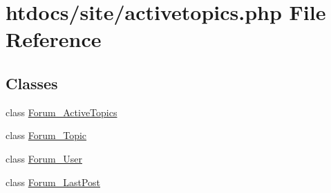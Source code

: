 \hypertarget{activetopics_8php}{\section{htdocs/site/activetopics.php File Reference}
\label{activetopics_8php}
}
\subsection*{Classes}
\begin{DoxyCompactItemize}
\item 
class \hyperlink{class_forum___active_topics}{Forum\-\_\-\-Active\-Topics}
\item 
class \hyperlink{class_forum___topic}{Forum\-\_\-\-Topic}
\item 
class \hyperlink{class_forum___user}{Forum\-\_\-\-User}
\item 
class \hyperlink{class_forum___last_post}{Forum\-\_\-\-Last\-Post}
\end{DoxyCompactItemize}
